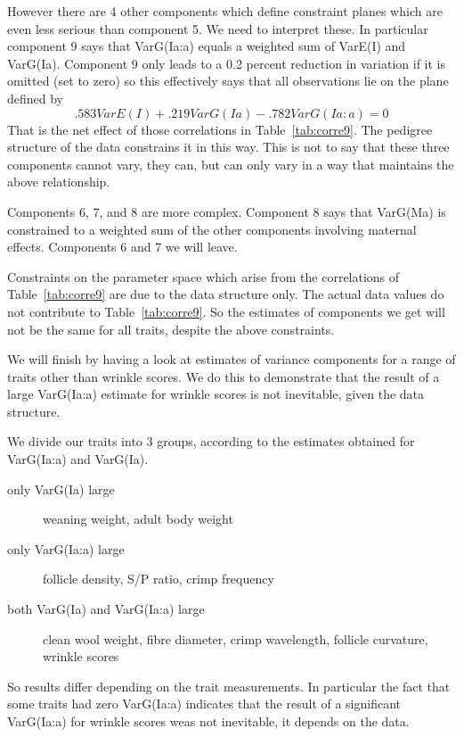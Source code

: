 \documentclass[titlepage]{article}  %
\begin{document}
However there are 4 other components which define constraint planes which are even less serious than component 5. We need to interpret these. In particular component 9 says that VarG(Ia:a) equals a weighted sum of VarE(I) and VarG(Ia). Component 9 only leads to a 0.2 percent reduction in variation if it is omitted (set to zero) so this effectively says that all observations lie on the plane defined by
\begin{displaymath}
.583 VarE(I) + .219 VarG(Ia) - .782 VarG(Ia:a) = 0
\end{displaymath}
That is the net effect of those correlations in Table~\ref{tab:corre9}. The pedigree structure of the data constrains it in this way. This is not to say that these three components cannot vary, they can, but can only vary in a way that maintains the above relationship. 

Components 6, 7, and 8 are more complex. Component 8 says that VarG(Ma) is constrained to a weighted sum of the other components involving maternal effects. Components 6 and 7 we will leave.

Constraints on the parameter space which arise from the correlations of Table~\ref{tab:corre9} are due to the data structure only. The actual data values do not contribute to Table~\ref{tab:corre9}. So the estimates of components we get will not be the same for all traits, despite the above constraints. 

We will finish by having a look at estimates of variance components for a range of traits other than wrinkle scores.  We do this to demonstrate that the result of a large VarG(Ia:a) estimate for wrinkle scores is not inevitable, given the data structure. 

We divide our traits into 3 groups, according to the estimates obtained for VarG(Ia:a) and VarG(Ia).
\begin{description}
\item[only VarG(Ia) large] weaning weight, adult body weight
\item[only VarG(Ia:a) large] follicle density, S/P ratio, crimp frequency
\item[both VarG(Ia) and VarG(Ia:a) large] clean wool weight, fibre diameter, crimp wavelength, follicle curvature, wrinkle scores
\end{description}

So results differ depending on the trait measurements. In particular the fact that some traits had zero VarG(Ia:a) indicates that the result of a significant VarG(Ia:a) for wrinkle scores weas not inevitable, it depends on the data.
\end{document}
